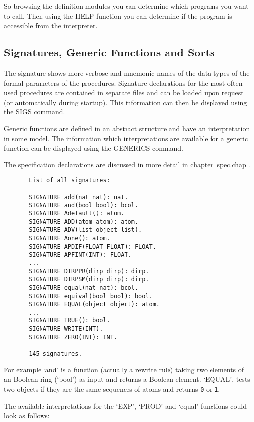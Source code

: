 So browsing the definition modules you 
can determine which programs you want to call.
Then using the HELP function you
can determine if the program is accessible from the interpreter.

\subsection{Signatures, Generic Functions and Sorts}

The signature shows more verbose and  
mnemonic names of the data types of the formal parameters of
the procedures. 
Signature declarations for the most often used procedures are 
contained in separate files and can be loaded upon request 
(or automatically during startup). 
This information can then be displayed using the
SIGS command.

Generic functions are defined in an abstract structure 
and have an interpretation in some model. 
The information which interpretations are available 
for a generic function can be displayed using the
GENERICS command.

The specification declarations are 
discussed in more detail in chapter \ref{spec.chap}.

\begin{verbatim}
       List of all signatures: 
        
       SIGNATURE add(nat nat): nat.
       SIGNATURE and(bool bool): bool.
       SIGNATURE Adefault(): atom.
       SIGNATURE ADD(atom atom): atom.
       SIGNATURE ADV(list object list).
       SIGNATURE Aone(): atom.
       SIGNATURE APDIF(FLOAT FLOAT): FLOAT.
       SIGNATURE APFINT(INT): FLOAT.
       ...
       SIGNATURE DIRPPR(dirp dirp): dirp.
       SIGNATURE DIRPSM(dirp dirp): dirp.
       SIGNATURE equal(nat nat): bool.
       SIGNATURE equival(bool bool): bool.
       SIGNATURE EQUAL(object object): atom.
       ...
       SIGNATURE TRUE(): bool.
       SIGNATURE WRITE(INT).
       SIGNATURE ZERO(INT): INT.
 
       145 signatures.
\end{verbatim}

For example `and' is a function 
(actually a rewrite rule) taking two elements of 
an Boolean ring (`bool') as input and returns
a Boolean element. 
`EQUAL', tests two objects 
if they are the same sequences of atoms and 
returns \verb/0/ or \verb/1/.

The available interpretations for the 
`EXP', `PROD' and `equal' 
functions could look as follows: 

